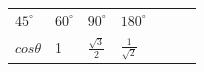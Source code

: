 {\begin{center}
\begin{xtabular*}{\mytablewidth}[t]{|p{10\mystarwidth}|p{10\mystarwidth}|p{10\mystarwidth}|p{10\mystarwidth}|p{10\mystarwidth}|p{10\mystarwidth}|p{10\mystarwidth}|}
                \begin{math}{45}^{\circ }\end{math}
               &
                \begin{math}{60}^{\circ }\end{math}
               &
                \begin{math}{90}^{\circ }\end{math}
               &
                \begin{math}{180}^{\circ }\end{math}
     \tabularnewline{}
                \begin{math}cos\theta \end{math}
               &
        1 &
                \begin{math}\frac{\sqrt{3}}{2}\end{math}
               &
                \begin{math}\frac{1}{\sqrt{2}}\end{math}

\end{xtabular*}
\end{center}}
